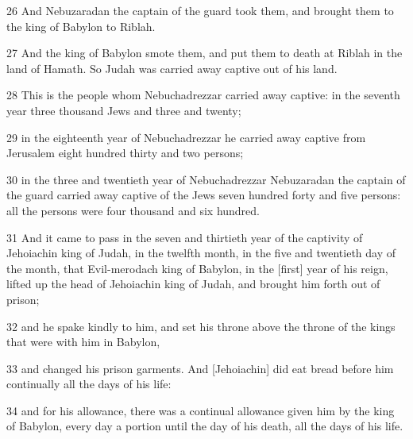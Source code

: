 \par 26 And Nebuzaradan the captain of the guard took them, and brought them to the king of Babylon to Riblah.
\par 27 And the king of Babylon smote them, and put them to death at Riblah in the land of Hamath. So Judah was carried away captive out of his land.
\par 28 This is the people whom Nebuchadrezzar carried away captive: in the seventh year three thousand Jews and three and twenty;
\par 29 in the eighteenth year of Nebuchadrezzar he carried away captive from Jerusalem eight hundred thirty and two persons;
\par 30 in the three and twentieth year of Nebuchadrezzar Nebuzaradan the captain of the guard carried away captive of the Jews seven hundred forty and five persons: all the persons were four thousand and six hundred.
\par 31 And it came to pass in the seven and thirtieth year of the captivity of Jehoiachin king of Judah, in the twelfth month, in the five and twentieth day of the month, that Evil-merodach king of Babylon, in the [first] year of his reign, lifted up the head of Jehoiachin king of Judah, and brought him forth out of prison;
\par 32 and he spake kindly to him, and set his throne above the throne of the kings that were with him in Babylon,
\par 33 and changed his prison garments. And [Jehoiachin] did eat bread before him continually all the days of his life:
\par 34 and for his allowance, there was a continual allowance given him by the king of Babylon, every day a portion until the day of his death, all the days of his life.

